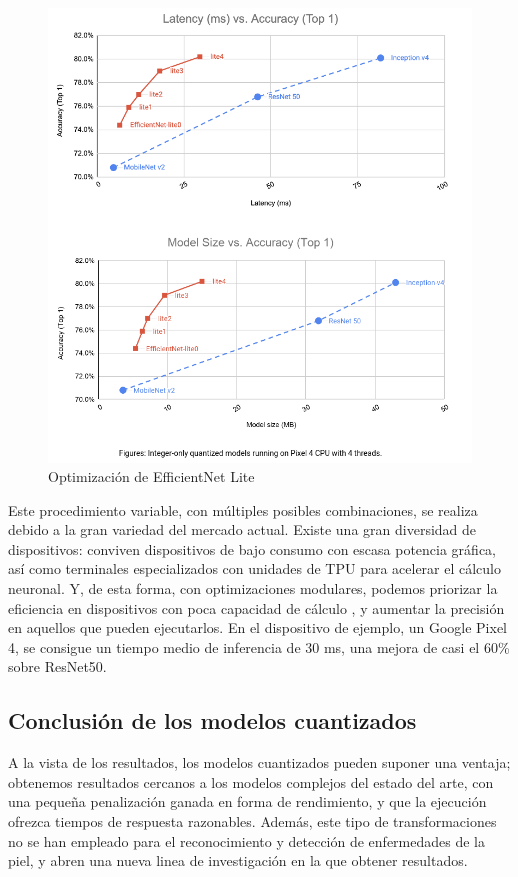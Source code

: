 \begin{figure}[H]
	\label{eflite}
	\centering
	\includegraphics[scale = 0.325]{imagenes/eflite.png}
	\caption{Optimización de EfficientNet Lite}
\end{figure}

Este procedimiento variable, con múltiples posibles combinaciones, se realiza debido a la gran variedad del mercado actual. Existe una gran diversidad de  dispositivos: conviven dispositivos de bajo consumo con escasa potencia gráfica, así como terminales especializados con unidades de TPU para acelerar el cálculo neuronal. Y, de esta forma, con optimizaciones modulares, podemos priorizar la eficiencia en dispositivos con poca capacidad de cálculo , y aumentar la precisión en aquellos que pueden ejecutarlos. En el dispositivo de ejemplo, un Google Pixel 4, se consigue un tiempo medio de inferencia de 30 ms, una mejora de casi el 60\% sobre ResNet50.

\subsection{Conclusión de los modelos cuantizados}

A la vista de los resultados, los modelos cuantizados pueden suponer una ventaja; obtenemos resultados cercanos a los modelos complejos del estado del arte, con una pequeña penalización ganada en forma de rendimiento, y que la ejecución ofrezca tiempos de respuesta razonables. Además, este tipo de transformaciones no se han empleado para el reconocimiento y detección de enfermedades de la piel, y abren una nueva linea de investigación en la que obtener resultados.

